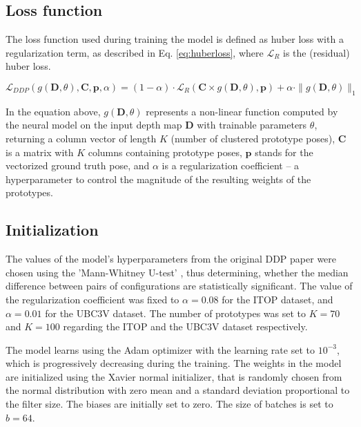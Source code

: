 \subsection{Loss function}

The loss function used during training the model is defined as huber loss with a regularization term, as described in Eq. \ref{eq:huberloss}, where $\mathcal{L}_R$ is the (residual) huber loss.\par

\begin{equation}
\mathcal{L}_{DDP}(g(\mathbf{D}, \theta), \mathbf{C}, \mathbf{p}, \alpha) = (1 - \alpha) \cdot \mathcal{L}_R(\mathbf{C} \times g(\mathbf{D}, \theta), \mathbf{p}) + \alpha \cdot \|g(\mathbf{D}, \theta)\|_1 \label{eq:huberloss}
\end{equation} 

\noindent In the equation above, $g(\mathbf{D}, \theta)$ represents a non-linear function computed by the neural model on the input depth map $\mathbf{D}$ with trainable parameters $\theta$, returning a column vector of length $K$ (number of clustered prototype poses), $\mathbf{C}$ is a matrix with $K$ columns containing prototype poses, $\mathbf{p}$ stands for the vectorized ground truth pose,  and $\alpha$ is a regularization coefficient  – a hyperparameter to control the magnitude of the resulting weights of the prototypes.

\subsection{Initialization}

The values of the model's hyperparameters from the original DDP paper were chosen using the 'Mann-Whitney U-test' \cite{mann1947}, thus determining, whether the median difference between pairs of configurations are statistically significant. The value of the regularization coefficient was fixed to $\alpha = 0.08$ for the ITOP dataset, and $\alpha = 0.01$ for the UBC3V dataset. The number of prototypes was set to $K=70$ and $K=100$ regarding the ITOP and the UBC3V dataset respectively.\par
\vspace{5mm}
\noindent
The model learns using the Adam optimizer with the learning rate set to $10^{-3}$, which is progressively decreasing during the training.  The weights in the model are initialized using the Xavier normal initializer, that is randomly chosen from the normal distribution with zero mean and a standard deviation proportional to the filter size. The biases are initially set to zero. The size of batches is set to $b=64$.

